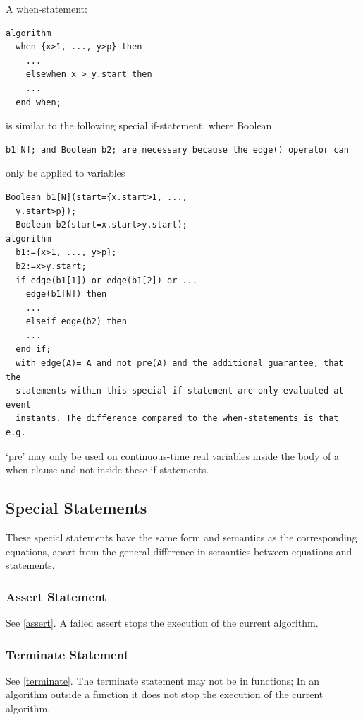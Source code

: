 \documentclass[10pt,a4paper]{report}
\def\doublelabel#1{\label{#1}\hypertarget{#1}{}}
\begin{document}
A when-statement:

\begin{lstlisting}[language=modelica]
algorithm
  when {x>1, ..., y>p} then
    ...
    elsewhen x > y.start then
    ...
  end when;
\end{lstlisting}
is similar to the following special if-statement, where Boolean
\begin{lstlisting}[language=modelica]
  b1[N]; and Boolean b2; are necessary because the edge() operator can
\end{lstlisting}
only be applied to variables

\begin{lstlisting}[language=modelica]
  Boolean b1[N](start={x.start>1, ...,
  y.start>p});
  Boolean b2(start=x.start>y.start);
algorithm
  b1:={x>1, ..., y>p};
  b2:=x>y.start;
  if edge(b1[1]) or edge(b1[2]) or ...
    edge(b1[N]) then 
    ...
    elseif edge(b2) then
    ...
  end if;
  with edge(A)= A and not pre(A) and the additional guarantee, that the
  statements within this special if-statement are only evaluated at event
  instants. The difference compared to the when-statements is that e.g.
\end{lstlisting}
`pre' may only be used on continuous-time real variables inside the body
of a when-clause and not inside these if-statements.

\subsection{Special Statements}\doublelabel{special-statements}

These special statements have the same form and semantics as the
corresponding equations, apart from the general difference in semantics
between equations and statements.

\subsubsection{Assert Statement}\doublelabel{assert-statement}

See \ref{assert}. A failed assert stops the execution of the current
algorithm.

\subsubsection{Terminate Statement}\doublelabel{terminate-statement}

See \ref{terminate}. The terminate statement may not be in functions; In
an algorithm outside a function it does not stop the execution of the
current algorithm.
\end{document}
